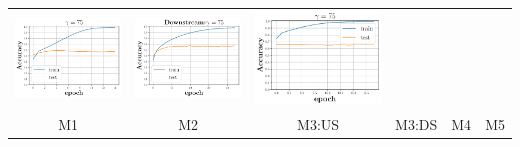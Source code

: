 \begin{minipage}{0.99\columnwidth}
{\begin{tabular}{cccccc}
\includegraphics[scale=0.125]{figs/galu_75_bad_good.pdf}&
\includegraphics[scale=0.125]{figs/relu_75_good.pdf}&
\includegraphics[scale=0.125]{figs/galu_75_recovered.pdf}\\
\tiny{M1}&\tiny{M2}&\tiny{M3:US}&\tiny{M3:DS}&\tiny{M4}&\tiny{M5}\\
\end{tabular}
}
\end{minipage}

